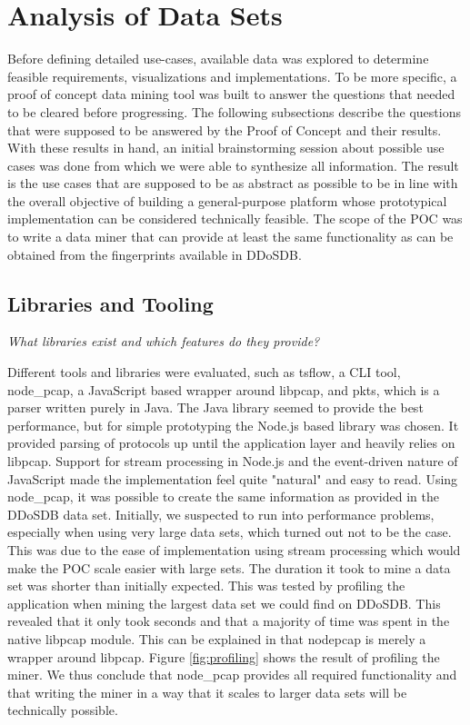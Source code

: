 \section{Analysis of Data Sets}
Before defining detailed use-cases, available data was explored to determine feasible requirements, visualizations and implementations. To be more specific, a proof of concept data mining tool was built to answer the questions that needed to be cleared before progressing. The following subsections describe the questions that were supposed to be answered by the Proof of Concept and their results. With these results in hand, an initial brainstorming session about possible use cases was done from which we were able to synthesize all information. The result is the use cases that are supposed to be as abstract as possible to be in line with the overall objective of building a general-purpose platform whose prototypical implementation can be considered technically feasible.
The scope of the POC was to write a data miner that can provide at least the same functionality as can be obtained from the fingerprints available in DDoSDB.

\subsection{Libraries and Tooling}\label{librariesandtooling}

\textit{What libraries exist and which features do they provide?}   

   Different tools and libraries were evaluated, such as tsflow, a CLI tool, node\_pcap, a JavaScript based wrapper around libpcap, and pkts, which is a parser written purely in Java.
    The Java library seemed to provide the best performance, but for simple prototyping the Node.js based library was chosen. It provided parsing of protocols up until the application layer and heavily relies on libpcap. Support for stream processing in Node.js and the event-driven nature of JavaScript made the implementation feel quite "natural" and easy to read.
    Using node\_pcap, it was possible to create the same information as provided in the DDoSDB data set. Initially, we suspected to run into performance problems, especially when using very large data sets, which turned out not to be the case. This was due to the ease of implementation using stream processing which would make the POC scale easier with large sets. The duration it took to mine a data set was shorter than initially expected. This was tested by profiling the application when mining the largest data set we could find on DDoSDB. This revealed that it only took seconds and that a majority of time was spent in the native libpcap module. This can be explained in that node\-pcap is merely a wrapper around libpcap. Figure \ref{fig:profiling} shows the result of profiling the miner. We thus conclude that node\_pcap provides all required functionality and that writing the miner in a way that it scales to larger data sets will be technically possible.
    
